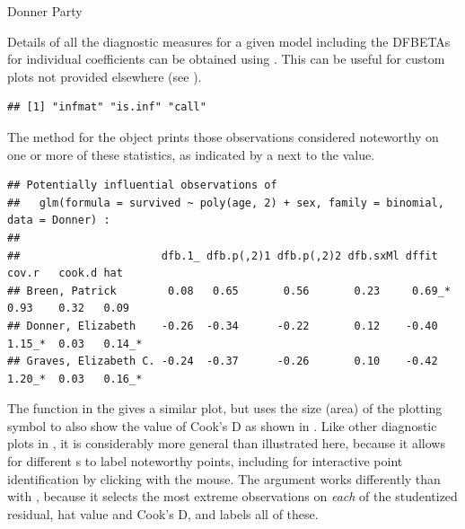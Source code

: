 \documentclass[11pt]{book}
\renewenvironment{knitrout}{\small\renewcommand{\baselinestretch}{.85}}{} %
\begin{document}
\begin{Example}[donner2]{Donner Party}
\begin{knitrout}
\end{knitrout}

Details of all the diagnostic measures for a given model including the DFBETAs for
individual coefficients can be obtained using .
This can be useful for custom plots not provided elsewhere (see ).
\begin{knitrout}
\color{fgcolor}\begin{kframe}
\begin{alltt}
 \hlkwb{<-} 
\end{alltt}
\begin{verbatim}
## [1] "infmat" "is.inf" "call"
\end{verbatim}
\end{kframe}
\end{knitrout}
The  method for the  object prints those
observations considered noteworthy on one or more of these statistics, as indicated
by a  next to the value.  
\begin{knitrout}\tiny
{}\color{fgcolor}\begin{kframe}
\begin{alltt}
\end{alltt}
\begin{verbatim}
## Potentially influential observations of
## 	 glm(formula = survived ~ poly(age, 2) + sex, family = binomial,      data = Donner) :
## 
##                      dfb.1_ dfb.p(,2)1 dfb.p(,2)2 dfb.sxMl dffit   cov.r   cook.d hat    
## Breen, Patrick        0.08   0.65       0.56       0.23     0.69_*  0.93    0.32   0.09  
## Donner, Elizabeth    -0.26  -0.34      -0.22       0.12    -0.40    1.15_*  0.03   0.14_*
## Graves, Elizabeth C. -0.24  -0.37      -0.26       0.10    -0.42    1.20_*  0.03   0.16_*
\end{verbatim}
\end{kframe}
\end{knitrout}


The function  in the  gives a similar plot, but uses the size (area)
of the plotting symbol to also show the value of Cook's D as shown in .  
Like other diagnostic plots
in , it is considerably more general than illustrated here, because
it allows for different s to label noteworthy points, including
 for interactive point identification by clicking with
the mouse. The  argument works differently than with , 
because it selects the most extreme  observations on \emph{each} of
the studentized residual, hat value and Cook's D, and labels all of these.


\end{Example}
\end{document}
